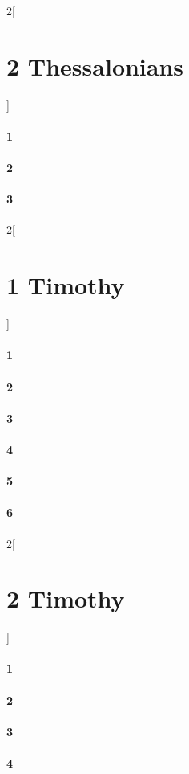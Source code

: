 \documentclass{book}
\begin{document}
\begin{multicols}{2}[\part{2 Thessalonians}]
\subsection*{1}
\subsection*{2}
\subsection*{3}
\end{multicols}
\begin{multicols}{2}[\part{1 Timothy}]
\subsection*{1}
\subsection*{2}
\subsection*{3}
\subsection*{4}
\subsection*{5}
\subsection*{6}
\end{multicols}
\begin{multicols}{2}[\part{2 Timothy}]
\subsection*{1}
\subsection*{2}
\subsection*{3}
\subsection*{4}
\end{multicols}
\end{document}
